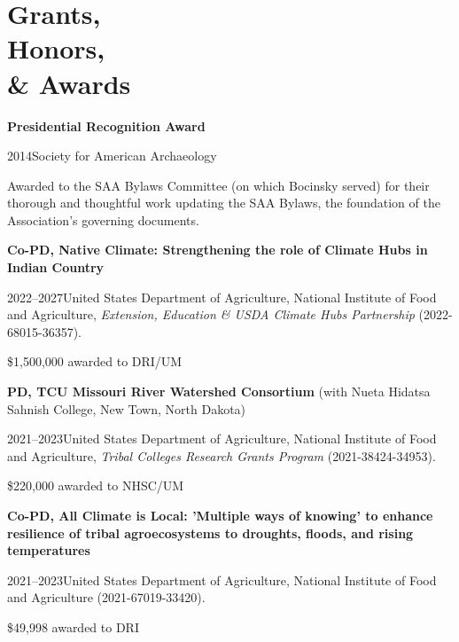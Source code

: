 \section{Grants, \\Honors, \\ \& Awards}

{\bf Presidential Recognition Award}
\begin{list1}
\item[] 2014\hspace{.2cm}Society for American Archaeology
\item[] Awarded to the SAA Bylaws Committee (on which Bocinsky served) for their thorough and thoughtful work updating the SAA Bylaws, the foundation of the Association’s governing documents.
\end{list1}

{\bf Co-PD, Native Climate: Strengthening the role of Climate Hubs in Indian Country} 
\begin{list1}
\item[] 2022–2027\hspace{.2cm}United States Department of Agriculture, National Institute of Food and Agriculture, \emph{Extension, Education \& USDA Climate Hubs Partnership} (2022-68015-36357).
\item[] \$1,500,000 awarded to DRI/UM
\end{list1}

{\bf PD, TCU Missouri River Watershed Consortium} (with Nueta Hidatsa Sahnish College, New Town, North Dakota)
\begin{list1}
\item[] 2021–2023\hspace{.2cm}United States Department of Agriculture, National Institute of Food and Agriculture, \emph{Tribal Colleges Research Grants Program} (2021-38424-34953).
\item[] \$220,000 awarded to NHSC/UM
\end{list1}


{\bf Co-PD, All Climate is Local: 'Multiple ways of knowing' to enhance resilience of tribal agroecosystems to droughts, floods, and rising temperatures}
\begin{list1}
\item[] 2021–2023\hspace{.2cm}United States Department of Agriculture, National Institute of Food and Agriculture (2021-67019-33420).
\item[] \$49,998 awarded to DRI
\end{list1}



